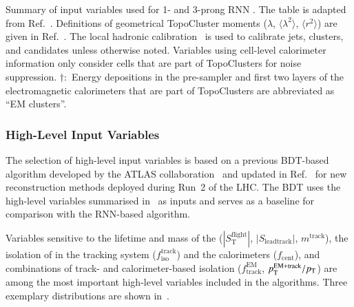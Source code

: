 \begin{table}[htbp]
  \centering

  \caption{Summary of input variables used for 1- and 3-prong RNN
    \tauid. The table is adapted from
    Ref.~\cite{ATL-PHYS-PUB-2019-033}. Definitions of geometrical
    TopoCluster moments ($\lambda$, $\langle \lambda^2 \rangle$,
    $\langle r^2 \rangle$) are given in Ref.~\cite{PERF-2014-07}. The
    local hadronic calibration~\cite{PERF-2014-07} is used to
    calibrate jets, clusters, and \tauhadvis candidates unless
    otherwise noted. Variables using cell-level calorimeter
    information only consider cells that are part of TopoClusters for
    noise suppression. $\dagger$:~Energy depositions in the
    pre-sampler and first two layers of the electromagnetic
    calorimeters that are part of TopoClusters are abbreviated as ``EM
    clusters''.}%
  \label{tab:tauid_input_variables}

  \resizebox{0.99\textwidth}{!}{
    
  }
\end{table}

\subsubsection{High-Level Input Variables}

The selection of high-level input variables is based on a previous
BDT-based \tauid algorithm developed by the ATLAS
collaboration~\cite{ATL-PHYS-PUB-2015-045} and updated in
Ref.~\cite{cdeutsch-master} for new \tauhadvis reconstruction methods
deployed during Run~2 of the LHC. The BDT \tauid uses the high-level
variables summarised in~ as inputs and
serves as a baseline for comparison with the RNN-based algorithm.

Variables sensitive to the lifetime and mass of the \taulepton
($|S_{\text{T}}^{\text{flight}}|$, $|S_{\text{leadtrack}}|$,
$m^{\text{track}}$), the isolation of \tauhadvis in the tracking
system ($f_{\text{iso}}^{\text{track}}$) and the calorimeters
($f_{\text{cent}}$), and combinations of track- and calorimeter-based
isolation ($f_{\text{track}}^{\text{EM}}$,
$p_{\text{T}}^{\text{EM+track}} / p_{\text{T}}$) are among the most important
high-level variables included in the \tauid algorithms. Three
exemplary distributions are shown in~.


